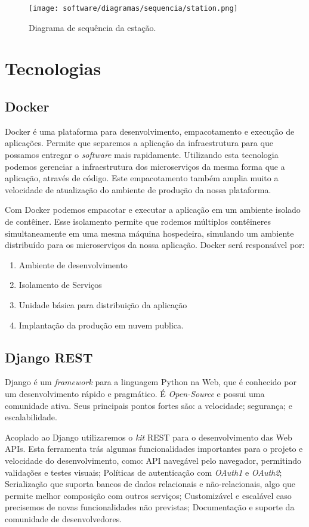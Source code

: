     \begin{figure}[H]
        \texttt{[image: software/diagramas/sequencia/station.png]}
        \caption{Diagrama de sequência da estação.}
        \label{fig:sequence_station}
    \end{figure}

	\section{Tecnologias}
	\subsection{Docker}
	Docker é uma plataforma para desenvolvimento, empacotamento e execução de aplicações. Permite que separemos a aplicação da infraestrutura para que possamos entregar o \textit{software} mais rapidamente. Utilizando esta tecnologia podemos gerenciar a infraestrutura dos microserviços da mesma forma que a aplicação, através de código. Este empacotamento também amplia muito a velocidade de atualização do ambiente de produção da nossa plataforma.
	
	Com Docker podemos empacotar e executar a aplicação em um ambiente isolado de contêiner. Esse isolamento permite que rodemos múltiplos contêineres simultaneamente em uma mesma máquina hospedeira, simulando um ambiente distribuído para os microserviços da nossa aplicação.
	Docker será responsável por:
	\begin{enumerate}
		\item Ambiente de desenvolvimento
		\item Isolamento de Serviços
		\item Unidade básica para distribuição da aplicação 
		\item Implantação da produção em nuvem publica.
	\end{enumerate}

	\subsection{Django REST}
		Django é um \textit{framework} para a linguagem Python na Web, que é conhecido por um desenvolvimento rápido e pragmático. É \textit{Open-Source} e possui uma comunidade ativa. Seus principais pontos fortes são: a velocidade; segurança; e escalabilidade.
		
		Acoplado ao Django utilizaremos o \textit{kit} REST para o desenvolvimento das Web APIs. Esta ferramenta trás algumas funcionalidades importantes para o projeto e velocidade do desenvolvimento, como: API navegável pelo navegador, permitindo validações e testes visuais; Políticas de autenticação com \textit{OAuth1} e \textit{OAuth2}; Serialização que suporta bancos de dados relacionais e não-relacionais, algo que permite melhor composição com outros serviços; Customizável e escalável caso precisemos de novas funcionalidades não previstas; Documentação e suporte da comunidade de desenvolvedores.

